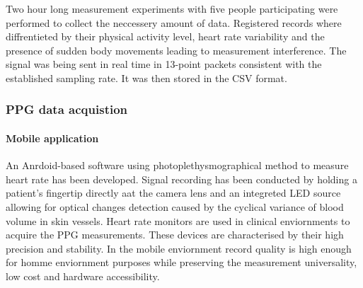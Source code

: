 \documentclass[journal]{IEEEtran}
\begin{document}
{Two hour long measurement experiments with five people participating were performed to collect the neccessery amount of data. Registered records where diffrentieted by their physical activity level, heart rate variability and the presence of sudden body movements leading to measurement interference. The signal was being sent in real time in 13-point packets consistent with the established sampling rate. It was then stored in the CSV format.


\subsubsection{PPG data acquistion}
\paragraph{Mobile application}
An Anrdoid-based software using photoplethysmographical method to measure heart rate has been developed. Signal recording has been conducted by holding a patient's fingertip directly aat the camera lens and an integreted LED source allowing for optical changes detection caused by the cyclical variance of blood volume in skin vessels.
\newpage
Heart rate monitors are used in clinical enviornments to acquire the PPG measurements. These devices are characterised by their high precision and stability. In the mobile enviornment record quality is high enough for homme enviornment purposes while preserving the measurement universality, low cost and hardware accessibility.


}
\end{document}
